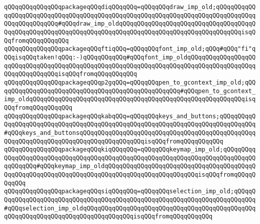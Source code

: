 \verb|qQQqqQQqqQQqqQQqpackageqQQqdiqQQqqQQq=qQQqqQQqdraw_imp_old;qQQqqQQqqQQqqQQqqQQqqQQqqQQqqQQqqQQqqQQqqQQqqQQqqQQqqQQqqQQqqQQqqQQqqQQqqQQqqQQqqQQqqQQqqQQqqQQq#qQQqdraw_imp_oldqQQqqQQqqQQqqQQqqQQqqQQqqQQqqQQqqQQqqQQqqQQqqQQqqQQqqQQqqQQqqQQqqQQqqQQqqQQqqQQqqQQqqQQqqQQqqQQqqQQqqQQqisqQQqfromqQQqqQQqqQQq|\newline
\verb|qQQqqQQqqQQqqQQqpackageqQQqftiqQQq=qQQqqQQqfont_imp_old;qQQq#qQQq"fi"qQQqisqQQqtaken!qQQq:-)qQQqqQQqqQQq#qQQqfont_imp_oldqQQqqQQqqQQqqQQqqQQqqQQqqQQqqQQqqQQqqQQqqQQqqQQqqQQqqQQqqQQqqQQqqQQqqQQqqQQqqQQqqQQqqQQqqQQqqQQqqQQqqQQqisqQQqfromqQQqqQQqqQQq|\newline
\verb|qQQqqQQqqQQqqQQqpackageqQQqp2gqQQq=qQQqqQQqpen_to_gcontext_imp_old;qQQqqQQqqQQqqQQqqQQqqQQqqQQqqQQqqQQqqQQqqQQqqQQqqQQq#qQQqpen_to_gcontext_imp_oldqQQqqQQqqQQqqQQqqQQqqQQqqQQqqQQqqQQqqQQqqQQqqQQqqQQqqQQqqQQqisqQQqfromqQQqqQQqqQQq|\newline
\verb|qQQqqQQqqQQqqQQqpackageqQQqkabqQQq=qQQqqQQqkeys_and_buttons;qQQqqQQqqQQqqQQqqQQqqQQqqQQqqQQqqQQqqQQqqQQqqQQqqQQqqQQqqQQqqQQqqQQqqQQqqQQqqQQq#qQQqkeys_and_buttonsqQQqqQQqqQQqqQQqqQQqqQQqqQQqqQQqqQQqqQQqqQQqqQQqqQQqqQQqqQQqqQQqqQQqqQQqqQQqqQQqqQQqqQQqisqQQqfromqQQqqQQqqQQq|\newline
\verb|qQQqqQQqqQQqqQQqpackageqQQqkiqQQqqQQq=qQQqqQQqkeymap_imp_old;qQQqqQQqqQQqqQQqqQQqqQQqqQQqqQQqqQQqqQQqqQQqqQQqqQQqqQQqqQQqqQQqqQQqqQQqqQQqqQQqqQQqqQQq#qQQqkeymap_imp_oldqQQqqQQqqQQqqQQqqQQqqQQqqQQqqQQqqQQqqQQqqQQqqQQqqQQqqQQqqQQqqQQqqQQqqQQqqQQqqQQqqQQqqQQqqQQqqQQqisqQQqfromqQQqqQQqqQQq|\newline
\verb|qQQqqQQqqQQqqQQqpackageqQQqsiqQQqqQQq=qQQqqQQqselection_imp_old;qQQqqQQqqQQqqQQqqQQqqQQqqQQqqQQqqQQqqQQqqQQqqQQqqQQqqQQqqQQqqQQqqQQqqQQqqQQq#qQQqselection_imp_oldqQQqqQQqqQQqqQQqqQQqqQQqqQQqqQQqqQQqqQQqqQQqqQQqqQQqqQQqqQQqqQQqqQQqqQQqqQQqqQQqqQQqisqQQqfromqQQqqQQqqQQq|\newline
